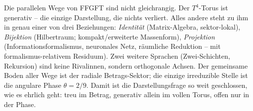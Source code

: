 \begin{conclusionBox}
Die parallelen Wege von FFGFT sind nicht gleichrangig. Der $T^4$-Torus ist generativ -- die einzige
Darstellung, die nichts verliert. Alles andere steht zu ihm in genau einer von drei Beziehungen:
\emph{Identität} (Matrix-Algebra, sektor-lokal), \emph{Bijektion} (Hilbertraum; kompakt/erweiterte
Massenform), \emph{Projektion} (Informationsformalismus, neuronales Netz, räumliche Reduktion --
mit formalismus-relativem Residuum). Zwei weitere Sprachen (Zwei-Schichten, Rekursion) sind keine
Rivalinnen, sondern orthogonale Achsen. Der gemeinsame Boden aller Wege ist der radiale
Betrags-Sektor; die einzige irreduzible Stelle ist die angulare Phase $\theta=2/9$. Damit ist die
Darstellungsfrage so weit geschlossen, wie es ehrlich geht: treu im Betrag, generativ allein im
vollen Torus, offen nur in der Phase.
\end{conclusionBox}
